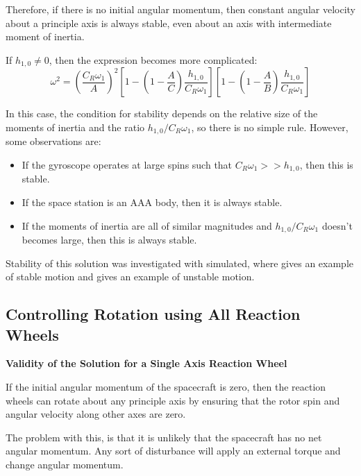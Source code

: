 \documentclass[12]{article}
\begin{document}
\begin{multicols*}{2}
Therefore, if there is no initial angular momentum, then constant angular velocity about a principle axis is always stable, even about an axis with intermediate moment of inertia.

If $h_{1,0} \neq 0$, then the expression becomes more complicated:
\begin{equation} \label{eq:reaction_wheel_stability_freq3}
\omega^2 = \left(\frac{C_R\omega_1}{A}\right)^2
\left[1 - \left(1 - \frac{A}{C}\right)\frac{h_{1,0}}{C_R\omega_1}\right]
\left[1 - \left(1 - \frac{A}{B}\right)\frac{h_{1,0}}{C_R\omega_1}\right]
\end{equation}

\vfill\null
\columnbreak

In this case, the condition for stability depends on the relative size of the moments of inertia and the ratio $h_{1,0}/C_R\omega_1$, so there is no simple rule. However, some observations are:
\begin{itemize}
\item If the gyroscope operates at large spins such that $C_R\omega_1 >> h_{1,0}$, then this is stable.
\item If the space station is an AAA body, then it is always stable.
\item If the moments of inertia are all of similar magnitudes and $h_{1,0}/C_R\omega_1$ doesn't becomes large, then this is always stable.
\end{itemize}

Stability of this solution was investigated with simulated, where  gives an example of stable motion and  gives an example of unstable motion.

\subsection{Controlling Rotation using All Reaction Wheels}

\textbf{Validity of the Solution for a Single Axis Reaction Wheel}

If the initial angular momentum of the spacecraft is zero, then the reaction wheels can rotate about any principle axis by ensuring that the rotor spin and angular velocity along other axes are zero.

The problem with this, is that it is unlikely that the spacecraft has no net angular momentum. Any sort of disturbance will apply an external torque and change angular momentum.


\end{multicols*}
\end{document}

